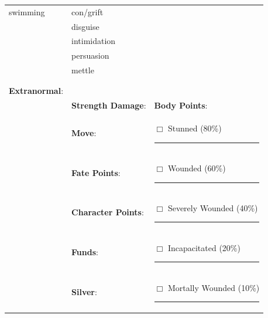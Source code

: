\begin{table}
\begin{tabular}{m{156pt} m{156pt} m{156pt}}
swimming \hrulefill               & con/grift \hrulefill            & \hrulefill                  \\
\hrulefill                        & disguise \hrulefill             & \hrulefill                  \\
\hrulefill                        & intimidation \hrulefill         & \hrulefill                  \\
\hrulefill                        & persuasion \hrulefill           &                             \\
\hrulefill                        & mettle \hrulefill               &                             \\
\hrulefill                        & \hrulefill                      &                             \\
                                  &                                 &                             \\
\textbf{Extranormal}: \hrulefill  &                                 &                             \\
\hrulefill                        & \textbf{Strength Damage}: \hrulefill     & \textbf{Body Points}: \hrulefill      \\
\hrulefill                        & \textbf{Move}: \hrulefill                & $\Box$ Stunned \footnotesize{(80\%)} \hfill \rule{2em}{0.4pt}          \\
\hrulefill                        & \textbf{Fate Points}: \hrulefill         & $\Box$ Wounded \footnotesize{(60\%)} \hfill\rule{2em}{0.4pt}           \\
\hrulefill                        & \textbf{Character Points}: \hrulefill    & $\Box$ Severely Wounded \footnotesize{(40\%)} \hfill\rule{2em}{0.4pt}  \\
\hrulefill                        & \textbf{Funds}: \hrulefill               & $\Box$ Incapacitated \footnotesize{(20\%)}\hfill \rule{2em}{0.4pt}     \\
\hrulefill                        & \textbf{Silver}: \hrulefill              & $\Box$ Mortally Wounded \footnotesize{(10\%)} \hfill \rule{2em}{0.4pt} \\
\end{tabular}
\end{table}
\newpage
